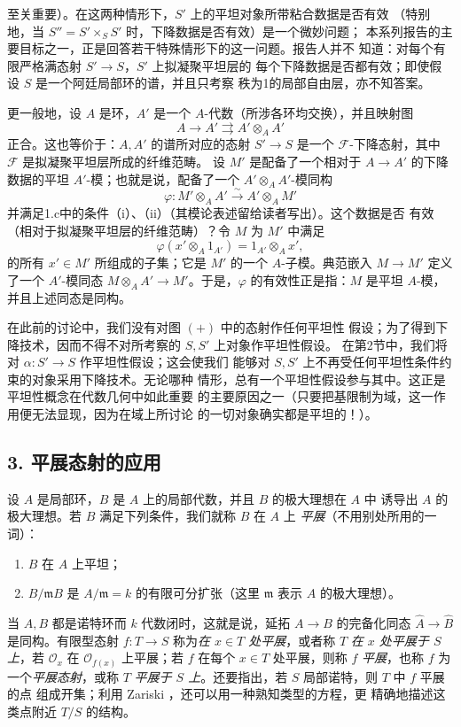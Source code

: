至关重要）。在这两种情形下，$S'$ 上的平坦对象所带粘合数据是否有效
（特别地，当 $S''=S'\times_SS'$ 时，下降数据是否有效）是一个微妙问题；
本系列报告的主要目标之一，正是回答若干特殊情形下的这一问题。报告人并不
知道：对每个有限严格满态射 $S'\longrightarrow S$，$S'$ 上拟凝聚平坦层的
每个下降数据是否都有效；即使假设 $S$ 是一个阿廷局部环的谱，并且只考察
秩为1的局部自由层，亦不知答案。

更一般地，设 $A$ 是环，$A'$ 是一个 $A$-代数（所涉各环均交换），并且映射图
\[
  A\longrightarrow A'\rightrightarrows A'\otimes_AA'
\]
正合。这也等价于：$A,A'$ 的谱所对应的态射 $S'\longrightarrow S$ 是一个
$\mathcal F$-下降态射，其中 $\mathcal F$ 是拟凝聚平坦层所成的纤维范畴。
设 $M'$ 是配备了一个相对于 $A\longrightarrow A'$ 的下降数据的平坦
$A'$-模；也就是说，配备了一个
$A'\otimes_AA'$-模同构
\[
  \varphi:M'\otimes_AA'\xrightarrow{\sim}A'\otimes_AM'
\]
并满足1.c中的条件（i）、（ii）（其模论表述留给读者写出）。这个数据是否
有效（相对于拟凝聚平坦层的纤维范畴）？令 $M$ 为 $M'$ 中满足
\[
  \varphi(x'\otimes_A1_{A'})=1_{A'}\otimes_Ax',
\]
的所有 $x'\in M'$ 所组成的子集；它是 $M'$ 的一个 $A$-子模。典范嵌入
$M\longrightarrow M'$ 定义了一个 $A'$-模同态
$M\otimes_AA'\longrightarrow M'$。于是，$\varphi$ 的有效性正是指：$M$
是平坦 $A$-模，并且上述同态是同构。

 在此前的讨论中，我们没有对图 $(+)$ 中的态射作任何平坦性
假设；为了得到下降技术，因而不得不对所考察的 $S,S'$ 上对象作平坦性假设。
在第2节中，我们将对 $\alpha:S'\longrightarrow S$ 作平坦性假设；这会使我们
能够对 $S,S'$ 上不再受任何平坦性条件约束的对象采用下降技术。无论哪种
情形，总有一个平坦性假设参与其中。这正是平坦性概念在代数几何中如此重要
的主要原因之一（只要把基限制为域，这一作用便无法显现，因为在域上所讨论
的一切对象确实都是平坦的！）。

\subsection*{3. 平展态射的应用}

设 $A$ 是局部环，$B$ 是 $A$ 上的局部代数，并且 $B$ 的极大理想在 $A$ 中
诱导出 $A$ 的极大理想。若 $B$ 满足下列条件，我们就称 $B$ 在 $A$ 上
\emph{平展}（不用别处所用的一词）：
\begin{enumerate}
\item[(i)] $B$ 在 $A$ 上平坦；
\item[(ii)] $B/\mathfrak mB$ 是 $A/\mathfrak m=k$ 的有限可分扩张（这里
$\mathfrak m$ 表示 $A$ 的极大理想）。
\end{enumerate}
当 $A,B$ 都是诺特环而 $k$ 代数闭时，这就是说，延拓
$A\longrightarrow B$ 的完备化同态
$\widehat A\longrightarrow\widehat B$ 是同构。有限型态射
$f:T\longrightarrow S$ 称为\emph{在 $x\in T$ 处平展}，或者称 $T$
\emph{在 $x$ 处平展于 $S$ 上}，若 $\mathcal O_x$ 在
$\mathcal O_{f(x)}$ 上平展；若 $f$ 在每个 $x\in T$ 处平展，则称 $f$
\emph{平展}，也称 $f$ 为一个\emph{平展态射}，或称 $T$
\emph{平展于 $S$ 上}。还要指出，若 $S$ 局部诺特，则 $T$ 中 $f$ 平展的点
组成开集；利用 Zariski ，还可以用一种熟知类型的方程，更
精确地描述这类点附近 $T/S$ 的结构。

